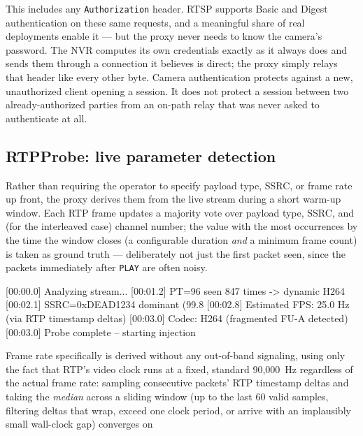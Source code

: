 \documentclass[11pt,a4paper]{article}
\newcommand{\code}[1]{\texttt{\small #1}}
\begin{document}
This includes any \code{Authorization} header. RTSP supports Basic and Digest authentication on these same requests, and a meaningful share of real deployments enable it --- but the proxy never needs to know the camera's password. The NVR computes its own credentials exactly as it always does and sends them through a connection it believes is direct; the proxy simply relays that header like every other byte. Camera authentication protects against a new, unauthorized client opening a session. It does not protect a session between two already-authorized parties from an on-path relay that was never asked to authenticate at all.

\subsection{RTPProbe: live parameter detection}
Rather than requiring the operator to specify payload type, SSRC, or frame rate up front, the proxy derives them from the live stream during a short warm-up window. Each RTP frame updates a majority vote over payload type, SSRC, and (for the interleaved case) channel number; the value with the most occurrences by the time the window closes (a configurable duration \emph{and} a minimum frame count) is taken as ground truth --- deliberately not just the first packet seen, since the packets immediately after \code{PLAY} are often noisy.

\begin{consolebox}
\begin{consolev}
\textcolor{consoleink!60}{[00:00.0]} Analyzing stream...
\textcolor{consoleink!60}{[00:01.2]} PT=96 seen 847 times -> dynamic H264
\textcolor{consoleink!60}{[00:02.1]} SSRC=0xDEAD1234 dominant (99.8%
\textcolor{consoleink!60}{[00:02.8]} Estimated FPS: 25.0 Hz (via RTP timestamp deltas)
\textcolor{consoleink!60}{[00:03.0]} Codec: H264 (fragmented FU-A detected)
\textcolor{greenc}{[00:03.0]} Probe complete -- starting injection
\end{consolev}
\end{consolebox}

Frame rate specifically is derived without any out-of-band signaling, using only the fact that RTP's video clock runs at a fixed, standard 90{,}000~Hz regardless of the actual frame rate: sampling consecutive packets' RTP timestamp deltas and taking the \emph{median} across a sliding window (up to the last 60 valid samples, filtering deltas that wrap, exceed one clock period, or arrive with an implausibly small wall-clock gap) converges on
\end{document}
